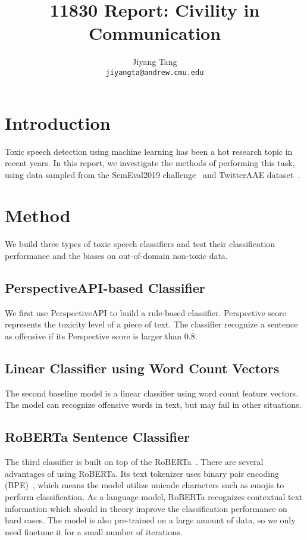 \documentclass[11pt]{article}
\title{11830 Report: Civility in Communication}
\author{
    Jiyang Tang \\
    \texttt{jiyangta@andrew.cmu.edu}
}
\begin{document}
    \maketitle


    \section{Introduction}

    Toxic speech detection using machine learning has been a hot research topic in recent years.
    In this report, we investigate the methods of performing this task, using data sampled from the SemEval2019
    challenge~\cite{semeval2019} and TwitterAAE dataset~\cite{twitter_aae}.


    \section{Method}

    We build three types of toxic speech classifiers and test their classification performance and the biases
    on out-of-domain non-toxic data.

    \subsection{PerspectiveAPI-based Classifier}

    We first use PerspectiveAPI to build a rule-based classifier.
    Perspective score represents the toxicity level of a piece of text.
    The classifier recognize a sentence as offensive if its Perspective score is larger than $0.8$.

    \subsection{Linear Classifier using Word Count Vectors}

    The second baseline model is a linear classifier using word count feature vectors.
    The model can recognize offensive words in text, but may fail in other situations.

    \subsection{RoBERTa Sentence Classifier}

    The third classifier is built on top of the RoBERTa~\cite{roberta}.
    There are several advantages of using RoBERTa.
    Its text tokenizer uses binary pair encoding (BPE)~\cite{BPE}, which means the model utilize unicode characters such as
    emojis to perform classification.
    As a language model, RoBERTa recognizes contextual text information which should in theory improve the
    classification performance on hard cases.
    The model is also pre-trained on a large amount of data, so we only need finetune it for a small number
    of iterations.
\end{document}
